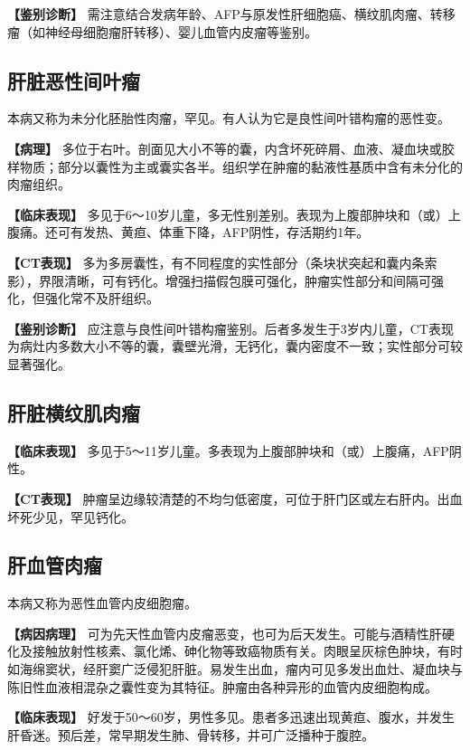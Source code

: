 \textbf{【鉴别诊断】}
需注意结合发病年龄、AFP与原发性肝细胞癌、横纹肌肉瘤、转移瘤（如神经母细胞瘤肝转移）、婴儿血管内皮瘤等鉴别。

\subsection{肝脏恶性间叶瘤}

本病又称为未分化胚胎性肉瘤，罕见。有人认为它是良性间叶错构瘤的恶性变。

\textbf{【病理】}
多位于右叶。剖面见大小不等的囊，内含坏死碎屑、血液、凝血块或胶样物质；部分以囊性为主或囊实各半。组织学在肿瘤的黏液性基质中含有未分化的肉瘤组织。

\textbf{【临床表现】}
多见于6～10岁儿童，多无性别差别。表现为上腹部肿块和（或）上腹痛。还可有发热、黄疸、体重下降，AFP阴性，存活期约1年。

\textbf{【CT表现】}
多为多房囊性，有不同程度的实性部分（条块状突起和囊内条索影），界限清晰，可有钙化。增强扫描假包膜可强化，肿瘤实性部分和间隔可强化，但强化常不及肝组织。

\textbf{【鉴别诊断】}
应注意与良性间叶错构瘤鉴别。后者多发生于3岁内儿童，CT表现为病灶内多数大小不等的囊，囊壁光滑，无钙化，囊内密度不一致；实性部分可较显著强化。

\subsection{肝脏横纹肌肉瘤}

\textbf{【临床表现】}
多见于5～11岁儿童。多表现为上腹部肿块和（或）上腹痛，AFP阴性。

\textbf{【CT表现】}
肿瘤呈边缘较清楚的不均匀低密度，可位于肝门区或左右肝内。出血坏死少见，罕见钙化。

\subsection{肝血管肉瘤}

本病又称为恶性血管内皮细胞瘤。

\textbf{【病因病理】}
可为先天性血管内皮瘤恶变，也可为后天发生。可能与酒精性肝硬化及接触放射性核素、氯化烯、砷化物等致癌物质有关。肉眼呈灰棕色肿块，有时如海绵窦状，经肝窦广泛侵犯肝脏。易发生出血，瘤内可见多发出血灶、凝血块与陈旧性血液相混杂之囊性变为其特征。肿瘤由各种异形的血管内皮细胞构成。

\textbf{【临床表现】}
好发于50～60岁，男性多见。患者多迅速出现黄疸、腹水，并发生肝昏迷。预后差，常早期发生肺、骨转移，并可广泛播种于腹腔。


